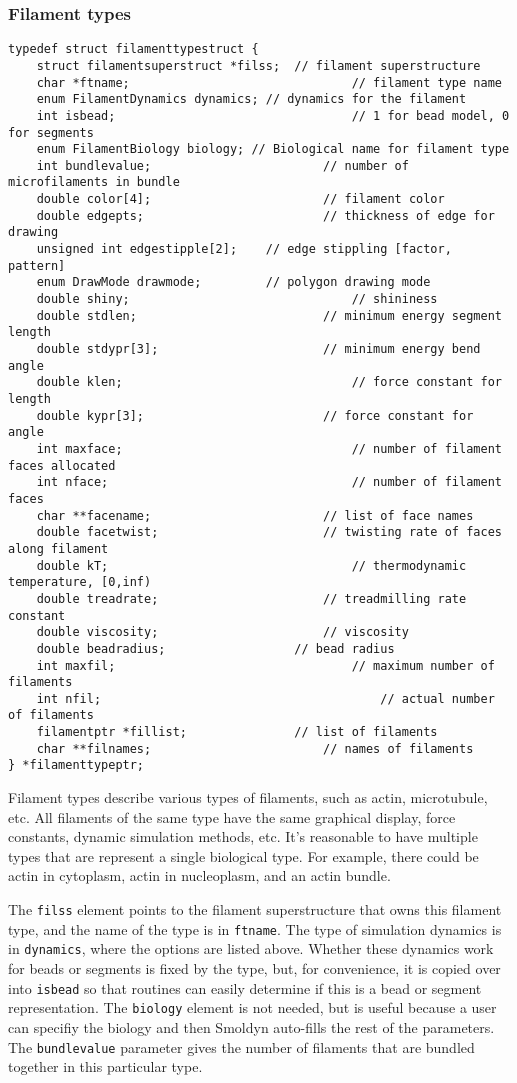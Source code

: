 \documentclass {scrbook}
\newcommand {\ttt} {\texttt}
\begin{document}
\subsubsection*{Filament types}

\begin{lstlisting}
typedef struct filamenttypestruct {
	struct filamentsuperstruct *filss;	// filament superstructure
	char *ftname;								// filament type name
	enum FilamentDynamics dynamics;	// dynamics for the filament
	int isbead;									// 1 for bead model, 0 for segments
	enum FilamentBiology biology; // Biological name for filament type
	int bundlevalue;						// number of microfilaments in bundle
	double color[4];						// filament color
	double edgepts;							// thickness of edge for drawing
	unsigned int edgestipple[2];	// edge stippling [factor, pattern]
	enum DrawMode drawmode;			// polygon drawing mode
	double shiny;								// shininess
	double stdlen;							// minimum energy segment length
	double stdypr[3];						// minimum energy bend angle
	double klen;								// force constant for length
	double kypr[3];							// force constant for angle
	int maxface;								// number of filament faces allocated
	int nface;									// number of filament faces
	char **facename;						// list of face names
	double facetwist;						// twisting rate of faces along filament
	double kT;									// thermodynamic temperature, [0,inf)
	double treadrate;						// treadmilling rate constant
	double viscosity;						// viscosity
	double beadradius;					// bead radius
	int maxfil;									// maximum number of filaments
	int nfil;										// actual number of filaments
	filamentptr *fillist;				// list of filaments
	char **filnames;						// names of filaments
} *filamenttypeptr;
\end{lstlisting}

Filament types describe various types of filaments, such as actin, microtubule, etc. All filaments of the same type have the same graphical display, force constants, dynamic simulation methods, etc. It's reasonable to have multiple types that are represent a single biological type. For example, there could be actin in cytoplasm, actin in nucleoplasm, and an actin bundle.

The \ttt{filss} element points to the filament superstructure that owns this filament type, and the name of the type is in \ttt{ftname}. The type of simulation dynamics is in \ttt{dynamics}, where the options are listed above. Whether these dynamics work for beads or segments is fixed by the type, but, for convenience, it is copied over into \ttt{isbead} so that routines can easily determine if this is a bead or segment representation. The \ttt{biology} element is not needed, but is useful because a user can specifiy the biology and then Smoldyn auto-fills the rest of the parameters. The \ttt{bundlevalue} parameter gives the number of filaments that are bundled together in this particular type.
\end{document}

